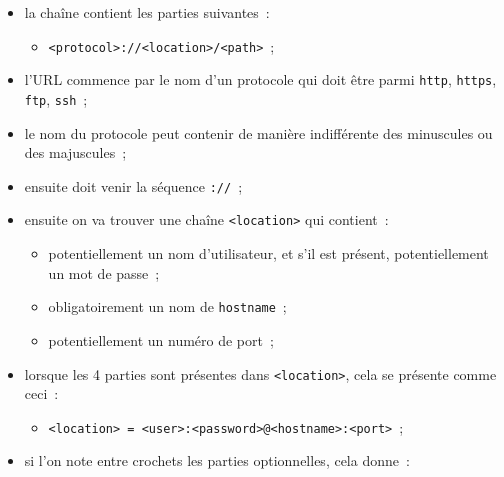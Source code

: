 \begin{itemize}
\tightlist
\item
  la chaîne contient les parties suivantes~:

  \begin{itemize}
  \tightlist
  \item
    \texttt{\textless{}protocol\textgreater{}://\textless{}location\textgreater{}/\textless{}path\textgreater{}}~;
  \end{itemize}
\item
  l'URL commence par le nom d'un protocole qui doit être parmi
  \texttt{http}, \texttt{https}, \texttt{ftp}, \texttt{ssh}~;
\item
  le nom du protocole peut contenir de manière indifférente des
  minuscules ou des majuscules~;
\item
  ensuite doit venir la séquence \texttt{://}~;
\item
  ensuite on va trouver une chaîne
  \texttt{\textless{}location\textgreater{}} qui contient~:

  \begin{itemize}
  \tightlist
  \item
    potentiellement un nom d'utilisateur, et s'il est présent,
    potentiellement un mot de passe~;
  \item
    obligatoirement un nom de \texttt{hostname}~;
  \item
    potentiellement un numéro de port~;
  \end{itemize}
\item
  lorsque les 4 parties sont présentes dans
  \texttt{\textless{}location\textgreater{}}, cela se présente comme
  ceci~:

  \begin{itemize}
  \tightlist
  \item
    \texttt{\textless{}location\textgreater{}\ =\ \textless{}user\textgreater{}:\textless{}password\textgreater{}@\textless{}hostname\textgreater{}:\textless{}port\textgreater{}}~;
  \end{itemize}
\item
  si l'on note entre crochets les parties optionnelles, cela donne~:


\end{itemize}
